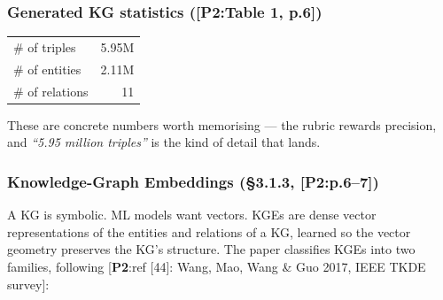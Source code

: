 \documentclass[11pt, a4paper]{article}
\newcommand{\paperref}[1]{\textcolor{srcBd}{\small[\textbf{P2}:#1]}}
\begin{document}
\subsubsection*{Generated KG statistics (\paperref{Table 1, p.6})}
\begin{center}
\begin{tabular}{lr}
\toprule
\# of triples & 5.95M \\
\# of entities & 2.11M \\
\# of relations & 11 \\
\bottomrule
\end{tabular}
\end{center}

These are concrete numbers worth memorising — the rubric rewards precision, and \emph{``5.95 million triples''} is the kind of detail that lands.

\subsubsection*{Knowledge-Graph Embeddings (§3.1.3, \paperref{p.6--7})}
A KG is symbolic. ML models want vectors. KGEs are dense vector representations of the entities and relations of a KG, learned so the vector geometry preserves the KG's structure. The paper classifies KGEs into two families, following \paperref{ref [44]: Wang, Mao, Wang \& Guo 2017, IEEE TKDE survey}:
\end{document}
